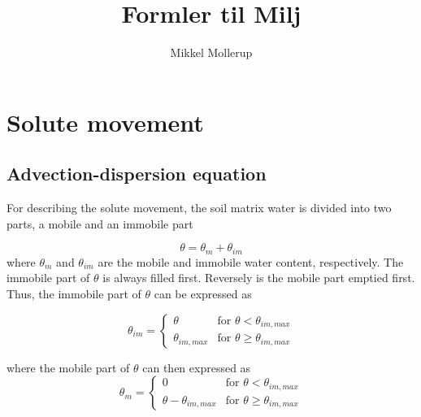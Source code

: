 \documentclass{report}
\begin{document}
%
%


\title{Formler til Milj\ostyrrelsen}

%
%

\author{Mikkel Mollerup}



\chapter{Solute movement}

\section{Advection-dispersion equation}

For describing the solute movement, the soil matrix water is divided
into two parts, a mobile and an immobile part

\begin{equation}
\theta= \theta_{m} + \theta_{im}
\end{equation}
%
where $\theta_{m}$ and $\theta_{im}$ are the mobile and immobile
water content, respectively. The immobile part of $\theta$ is always
filled first. Reversely is the mobile part emptied first. Thus, the
immobile part of $\theta$ can be expressed as

\begin{equation}
\theta_{im}=
\begin{cases}
\theta & \text{for\ } \theta < \theta_{im,max} \\
\theta_{im,max} & \text{for\ } \theta \geq \theta_{im,max}
\end{cases}
\end{equation}


%
where the mobile part of $\theta$ can then expressed as
%
\begin{equation}
\theta_{m}=
\begin{cases}
 0 & \text{for\ } \theta < \theta_{im,max} \\
\theta -\theta_{im,max} & \text{for\ } \theta \geq \theta_{im,max}
\end{cases}
\end{equation}
%
\end{document}
